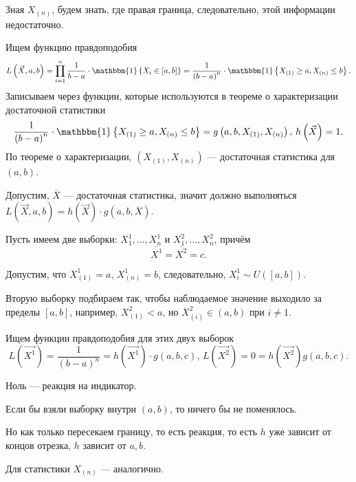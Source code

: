 Зная $X_{ \left( n \right) }$, будем знать, где правая граница, следовательно,
этой информации недостаточно.

Ищем функцию правдоподобия
$$L \left( \vec{X}, a, b \right) =
  \prod \limits_{i = 1}^n
    \frac{1}{b - a} \cdot \mathbbm{1} \left\{ X_i \in \left[ a, b \right] \right\} =
  \frac{1}{ \left( b - a \right)^n} \cdot
  \mathbbm{1} \left\{ X_{ \left( 1 \right) } \geq a, X_{ \left( n \right) } \leq b \right\}.$$
Записываем через функции, которые используются в теореме о характеризации достаточной статистики
$$ \frac{1}{ \left( b - a \right)^n} \cdot
  \mathbbm{1} \left\{ X_{ \left( 1 \right) } \geq a, X_{ \left( n \right) } \leq b \right\} =
  g \left( a, b, X_{ \left( 1 \right) }, X_{ \left( n \right) } \right), \,
  h \left( \vec{X} \right) = 1.$$
По теореме о характеризации, $ \left( X_{ \left( 1 \right) }, X_{ \left( n \right) } \right) $ ---
достаточная статистика для $ \left( a, b \right) $.

Допустим, $ \overline{X}$ --- достаточная статистика,
значит должно выполняться
$L \left( \vec{X}, a, b \right) =
  h \left( \vec{X} \right) \cdot g \left( a, b, \overline{X} \right) $.

Пусть имеем две выборки: $X_1^1, \dotsc, X_n^1$ и $X_1^2, \dotsc, X_n^2$,
причём
$$ \overline{X^1} =
  \overline{X^2} =
  c.$$

Допустим, что $X_{ \left( 1 \right) }^1 = a, \, X_{ \left( n \right) }^1 = b$, следовательно,
$X_i^1 \sim U \left( \left[ a, b \right] \right) $.

Вторую выборку подбираем так,
чтобы наблюдаемое значение выходило за пределы $ \left[ a, b \right] $, например,
$X_{ \left( 1 \right) }^2 < a$,
но $X_{ \left( i \right) }^2 \in \left( a, b \right) $ при $i \neq 1$.

Ищем функции правдоподобия для этих двух выборок
$$L \left( \vec{X^1} \right) =
  \frac{1}{ \left( b - a \right)^n} =
  h \left( \vec{X^1} \right) \cdot g \left( a, b, c \right), \,
  L \left( \vec{X^2} \right) =
  0 =
  h \left( \vec{X^2} \right) g \left( a, b, c \right).$$

Ноль --- реакция на индикатор.

Если бы взяли выборку внутри $ \left( a, b \right) $, то ничего бы не поменялось.

Но как только пересекаем границу, то есть реакция, то есть $h$ уже зависит от концов отрезка,
$h$ зависит от $a, b$.

Для статистики $X_{ \left( n \right) }$ --- аналогично.

